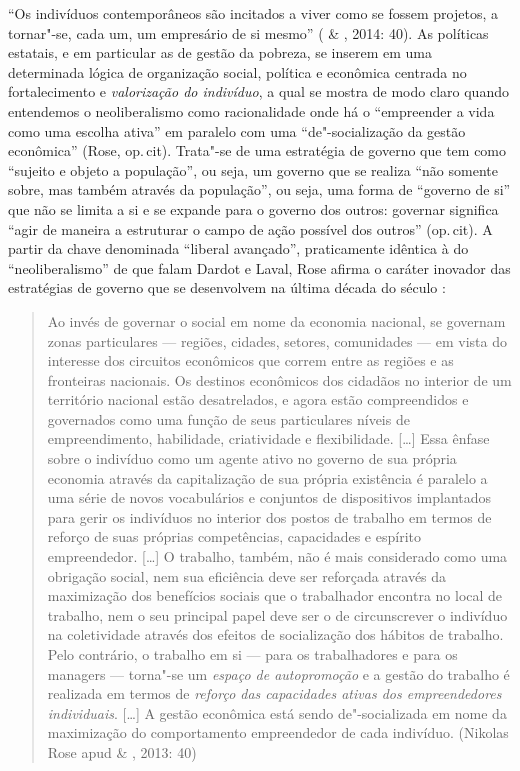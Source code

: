 ``Os indivíduos contemporâneos são incitados a viver como se fossem
projetos, a tornar"-se, cada um, um empresário de si mesmo'' ( \&
, 2014: 40). As políticas estatais, e em particular as de gestão
da pobreza, se inserem em uma determinada lógica de organização social,
política e econômica centrada no fortalecimento e \emph{valorização do
indivíduo}, a qual se mostra de modo claro quando entendemos o
neoliberalismo como racionalidade onde há o ``empreender a vida como uma
escolha ativa'' em paralelo com uma ``de"-socialização da gestão
econômica'' (Rose, op.\,cit). Trata"-se de uma estratégia de governo que
tem como ``sujeito e objeto a população'', ou seja, um governo que se
realiza ``não somente sobre, mas também através da população'', ou seja,
uma forma de ``governo de si'' que não se limita a si e se expande para
o governo dos outros: governar significa ``agir de maneira a estruturar
o campo de ação possível dos outros'' (op.\,cit). A partir da chave
denominada ``liberal avançado'', praticamente idêntica à do
``neoliberalismo'' de que falam Dardot e Laval, Rose afirma o caráter
inovador das estratégias de governo que se desenvolvem na última década
do século :

\begin{quote}
Ao invés de governar o social em nome da economia nacional, se governam
zonas particulares --- regiões, cidades, setores, comunidades --- em vista
do interesse dos circuitos econômicos que correm entre as regiões e as
fronteiras nacionais. Os destinos econômicos dos cidadãos no interior de
um território nacional estão desatrelados, e agora estão compreendidos e
governados como uma função de seus particulares níveis de
empreendimento, habilidade, criatividade e flexibilidade. {[}\ldots{}{]} Essa
ênfase sobre o indivíduo como um agente ativo no governo de sua própria
economia através da capitalização de sua própria existência é paralelo a
uma série de novos vocabulários e conjuntos de dispositivos implantados
para gerir os indivíduos no interior dos postos de trabalho em termos de
reforço de suas próprias competências, capacidades e espírito
empreendedor. {[}\ldots{}{]} O trabalho, também, não é mais considerado como
uma obrigação social, nem sua eficiência deve ser reforçada através da
maximização dos benefícios sociais que o trabalhador encontra no local
de trabalho, nem o seu principal papel deve ser o de circunscrever o
indivíduo na coletividade através dos efeitos de socialização dos
hábitos de trabalho. Pelo contrário, o trabalho em si --- para os
trabalhadores e para os managers --- torna"-se um \emph{espaço de
autopromoção} e a gestão do trabalho é realizada em termos de
\emph{reforço das capacidades ativas dos empreendedores individuais}.
{[}\ldots{}{]} A gestão econômica está sendo de"-socializada em nome da
maximização do comportamento empreendedor de cada indivíduo. (Nikolas
Rose apud  \& , 2013: 40)
\end{quote}

